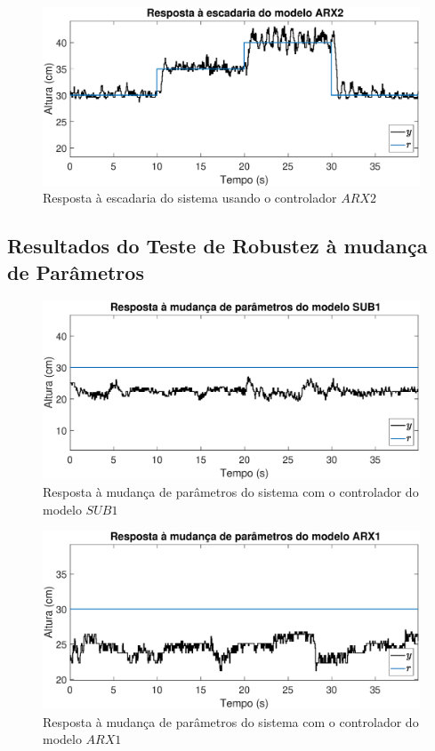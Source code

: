 \begin{figure}[H]
	\centering
	\includegraphics[width=1\linewidth]{stairrealarx2}
	\caption[Resposta à escadaria do sistema controlado $ARX2$]{Resposta à escadaria do sistema usando o controlador $ARX2$}
	\label{fig:stairrealarx2}
\end{figure}

\subsection{Resultados do Teste de Robustez à mudança de Parâmetros}\label{rmp}

\begin{figure}[H]
	\centering
	\includegraphics[width=1\linewidth]{mprealsub1}
	\caption[Resposta à mudança de parâmetros do modelo $SUB1$]{Resposta à mudança de parâmetros do sistema com o controlador do modelo $SUB1$}
	\label{fig:mprealsub1}
\end{figure}

\begin{figure}[H]
	\centering
	\includegraphics[width=1\linewidth]{mprealarx1}
	\caption[Resposta à mudança de parâmetros do modelo $ARX1$]{Resposta à mudança de parâmetros do sistema com o controlador do modelo $ARX1$}
	\label{fig:mprealarx1}
\end{figure}

